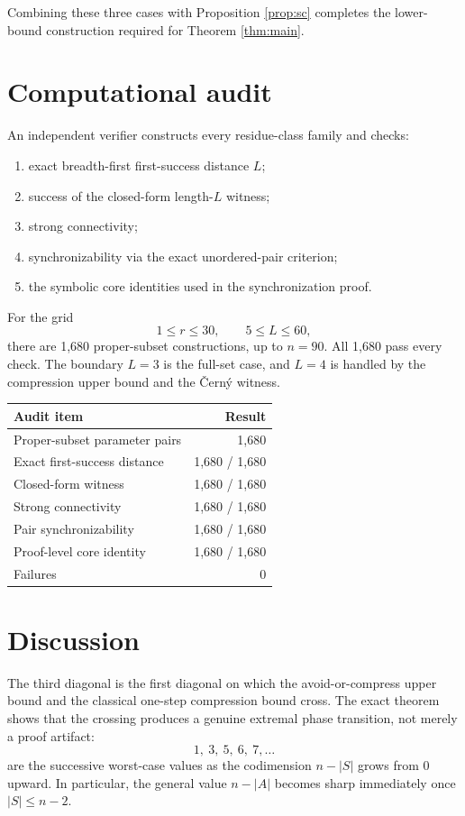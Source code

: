 \documentclass[11pt]{article}
\theoremstyle{definition}
\theoremstyle{remark}
\begin{document}
Combining these three cases with Proposition \ref{prop:sc} completes the lower-bound construction required for Theorem \ref{thm:main}.

\section{Computational audit}\label{sec:audit}
An independent verifier constructs every residue-class family and checks:
\begin{enumerate}[label=(\roman*)]
\item exact breadth-first first-success distance $L$;
\item success of the closed-form length-$L$ witness;
\item strong connectivity;
\item synchronizability via the exact unordered-pair criterion;
\item the symbolic core identities used in the synchronization proof.
\end{enumerate}
For the grid
\[
1\le r\le30,\qquad 5\le L\le60,
\]
there are 1,680 proper-subset constructions, up to $n=90$. All 1,680 pass every check. The boundary $L=3$ is the full-set case, and $L=4$ is handled by the compression upper bound and the \v{C}ern\'y witness.

\begin{center}
\begin{tabular}{lr}
\toprule
Audit item & Result\\
\midrule
Proper-subset parameter pairs & 1,680\\
Exact first-success distance & 1,680 / 1,680\\
Closed-form witness & 1,680 / 1,680\\
Strong connectivity & 1,680 / 1,680\\
Pair synchronizability & 1,680 / 1,680\\
Proof-level core identity & 1,680 / 1,680\\
Failures & 0\\
\bottomrule
\end{tabular}
\end{center}

\section{Discussion}
The third diagonal is the first diagonal on which the avoid-or-compress upper bound and the classical one-step compression bound cross. The exact theorem shows that the crossing produces a genuine extremal phase transition, not merely a proof artifact:
\[
1,\ 3,\ 5,\ 6,\ 7,\ldots
\]
are the successive worst-case values as the codimension $n-|S|$ grows from $0$ upward. In particular, the general value $n-|A|$ becomes sharp immediately once $|S|\le n-2$.
\end{document}
